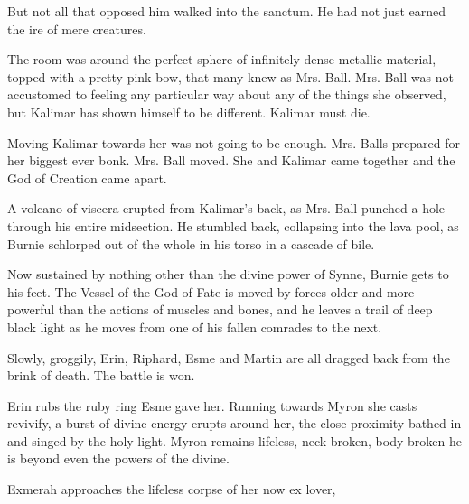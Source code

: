 But not all that opposed him walked into the sanctum. He had not just earned the ire of mere creatures.\medskip

The room was around the perfect sphere of infinitely dense metallic material, topped with a pretty pink bow, that many knew as Mrs. Ball. Mrs. Ball was not accustomed to feeling any particular way about any of the things she observed, but Kalimar has shown himself to be different. Kalimar must die.\medskip

Moving Kalimar towards her was not going to be enough. Mrs. Balls prepared for her biggest ever bonk. Mrs. Ball moved. She and Kalimar came together and the God of Creation came apart.\medskip

A volcano of viscera erupted from Kalimar’s back, as Mrs. Ball punched a hole through his entire midsection. He stumbled back, collapsing into the lava pool, as Burnie schlorped out of the whole in his torso in a cascade of bile.\medskip

Now sustained by nothing other than the divine power of Synne, Burnie gets to his feet. The Vessel of the God of Fate is moved by forces older and more powerful than the actions of muscles and bones, and he leaves a trail of deep black light as he moves from one of his fallen comrades to the next.\medskip

Slowly, groggily, Erin, Riphard, Esme and Martin are all dragged back from the brink of death. The battle is won.\medskip

Erin rubs the ruby ring Esme gave her. Running towards Myron she casts revivify, a burst of divine energy erupts around her, the close proximity bathed in and singed by the holy light. Myron remains lifeless, neck broken, body broken he is beyond even the powers of the divine.\medskip

Exmerah approaches the lifeless corpse of her now ex lover,\medskip

\vspace*{5mm}
